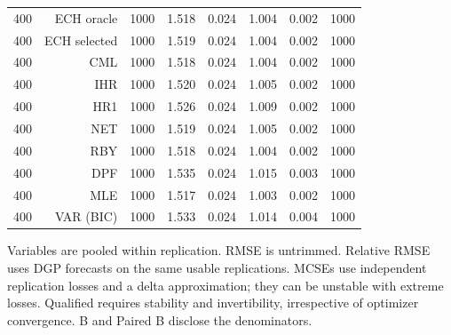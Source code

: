 \begin{table}[p]
\begin{tabular}{rrrrrrrr}
400 & ECH oracle & 1000 & 1.518 & 0.024 & 1.004 & 0.002 & 1000 \\
400 & ECH selected & 1000 & 1.519 & 0.024 & 1.004 & 0.002 & 1000 \\
400 & CML & 1000 & 1.518 & 0.024 & 1.004 & 0.002 & 1000 \\
400 & IHR & 1000 & 1.520 & 0.024 & 1.005 & 0.002 & 1000 \\
400 & HR1 & 1000 & 1.526 & 0.024 & 1.009 & 0.002 & 1000 \\
400 & NET & 1000 & 1.519 & 0.024 & 1.005 & 0.002 & 1000 \\
400 & RBY & 1000 & 1.518 & 0.024 & 1.004 & 0.002 & 1000 \\
400 & DPF & 1000 & 1.535 & 0.024 & 1.015 & 0.003 & 1000 \\
400 & MLE & 1000 & 1.517 & 0.024 & 1.003 & 0.002 & 1000 \\
400 & VAR (BIC) & 1000 & 1.533 & 0.024 & 1.014 & 0.004 & 1000 \\
\bottomrule\end{tabular}
\par\medskip
\begin{minipage}{0.98\linewidth}\footnotesize Variables are pooled within replication. RMSE is untrimmed. Relative RMSE uses DGP forecasts on the same usable replications. MCSEs use independent replication losses and a delta approximation; they can be unstable with extreme losses. Qualified requires stability and invertibility, irrespective of optimizer convergence. B and Paired B disclose the denominators.\end{minipage}
\end{table}
